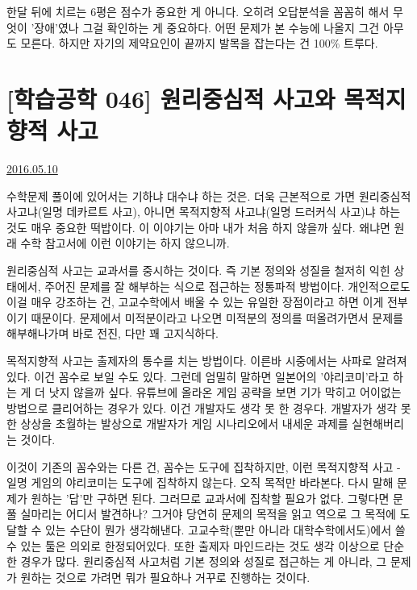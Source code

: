 한달 뒤에 치르는 6평은 점수가 중요한 게 아니다. 오히려 오답분석을 꼼꼼히 해서 무엇이 '장애'였나 그걸 확인하는 게 중요하다.
어떤 문제가 본 수능에 나올지 그건 아무도 모른다. 하지만 자기의 제약요인이 끝까지 발목을 잡는다는 건 100$\%$ 트루다.
\vspace{5mm}






\section{[학습공학 046] 원리중심적 사고와 목적지향적 사고}
\href{https://www.kockoc.com/Apoc/767400}{2016.05.10}

\vspace{5mm}

수학문제 풀이에 있어서는 기하냐 대수냐 하는 것은.
더욱 근본적으로 가면 원리중심적 사고냐(일명 데카르트 사고), 아니면 목적지향적 사고냐(일명 드러커식 사고)냐 하는 것도 매우 중요한 떡밥이다.
이 이야기는 아마 내가 처음 하지 않을까 싶다. 왜냐면 원래 수학 참고서에 이런 이야기는 하지 않으니까.
\vspace{5mm}

원리중심적 사고는 교과서를 중시하는 것이다.
즉 기본 정의와 성질을 철저히 익힌 상태에서, 주어진 문제를 잘 해부하는 식으로 접근하는 정통파적 방법이다.
개인적으로도 이걸 매우 강조하는 건, 고교수학에서 배울 수 있는 유일한 장점이라고 하면 이게 전부이기 때문이다.
문제에서 미적분이라고 나오면 미적분의 정의를 떠올려가면서 문제를 해부해나가며 바로 전진, 다만 꽤 고지식하다.
\vspace{5mm}

목적지향적 사고는 출제자의 통수를 치는 방법이다. 이른바 시중에서는 사파로 알려져있다.
이건 꼼수로 보일 수도 있다. 그런데 엄밀히 말하면 일본어의 '야리코미'라고 하는 게 더 낫지 않을까 싶다.
유튜브에 올라온 게임 공략을 보면 기가 막히고 어이없는 방법으로 클리어하는 경우가 있다. 이건 개발자도 생각 못 한 경우다.
개발자가 생각 못 한 상상을 초월하는 발상으로 개발자가 게임 시나리오에서 내세운 과제를 실현해버리는 것이다.
\vspace{5mm}

이것이 기존의 꼼수와는 다른 건, 꼼수는 도구에 집착하지만, 이런 목적지향적 사고 - 일명 게임의 야리코미는 도구에 집착하지 않는다.
오직 목적만 바라본다. 다시 말해 문제가 원하는 '답'만 구하면 된다. 그러므로 교과서에 집착할 필요가 없다.
그렇다면 문풀 실마리는 어디서 발견하나? 그거야 당연히 문제의 목적을 읽고 역으로 그 목적에 도달할 수 있는 수단이 뭔가 생각해낸다.
고교수학(뿐만 아니라 대학수학에서도)에서 쓸 수 있는 툴은 의외로 한정되어있다. 또한 출제자 마인드라는 것도 생각 이상으로 단순한 경우가 많다.
원리중심적 사고처럼 기본 정의와 성질로 접근하는 게 아니라, 그 문제가 원하는 것으로 가려면 뭐가 필요하나 거꾸로 진행하는 것이다.
\vspace{5mm}

